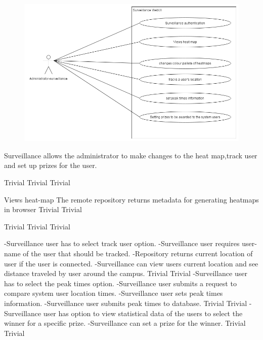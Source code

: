 \begin{figure}[h]
  \includegraphics[width=\textwidth]{diagrams/Specific_Requirements/surveillance_webUI.png}
\end{figure}

Surveillance allows the administrator to make changes to the heat map,track user and set up prizes for the user.

 		{Trivial}
    {Trivial}
    {Trivial}

\FuncReq
    { Views heat-map}
		{The remote repository returns metadata for generating heatmaps in browser}
    {Trivial}
    {Trivial}

		{Trivial}
    {Trivial}
    {Trivial}
	
		{-Surveillance user has to select track user option.
		-Surveillance user requires user-name of the user that should be tracked.
		-Repository returns current location of user if the user is connected.
		-Surveillance can view users current location and see distance traveled by user around the campus.}
    {Trivial}
    {Trivial}
		{-Surveillance user has to select the peak times option.
		-Surveillance user submits a request to compare system user location times.
		-Surveillance user sets peak times information.
		-Surveillance user submits peak times to database.}
    {Trivial}
    {Trivial}
		{-Surveillance user has option to view statistical data of the users to select the winner for a specific prize.
		 -Surveillance can set a prize for the winner.}
    {Trivial}
    {Trivial}
